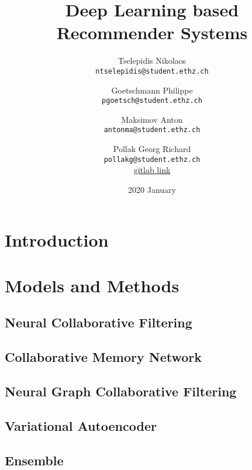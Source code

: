 \documentclass[
  twoColumns,
  fontsize=10pt,
  baseClass=extarticle
]{formularyETH/formularyETH}
\title{Deep Learning based Recommender Systems}
\author{
Tselepidis Nikolaos \\
\small{\texttt{ntselepidis@student.ethz.ch}}
    \and
Goetschmann Philippe \\
\small{\texttt{pgoetsch@student.ethz.ch}}
    \and
Maksimov Anton \\
\small{\texttt{antonma@student.ethz.ch}}
    \and
Pollak Georg Richard \\
\small{\texttt{pollakg@student.ethz.ch}}\\
{\normalsize
\faGithub\href{https://gitlab.ethz.ch/master/electives/deep-learning/deep-learning-based-recommender-systems/tree/master}{gitlab link}
}
}
\date{2020 January}
\begin{document}
\twocolumn[{%
  \begin{@twocolumnfalse} 
  \centering
  \maketitle
  \begin{abstract}
    
  \end{abstract}
  \end{@twocolumnfalse}
  \vspace*{-3em}
}]

\section{Introduction}\label{sec:introduction}


\section{Models and Methods}\label{sec:models_and_methods}
\subsection{Neural Collaborative Filtering}\label{subsec:neural_collaborative_filtering}

\subsection{Collaborative Memory Network}\label{subsec:collaborative_memory_network}

\subsection{Neural Graph Collaborative Filtering}\label{subsec:neural_graph_collaborative_filtering}

\subsection{Variational Autoencoder}\label{subsec:variational_autoencoder}

\subsection{Ensemble}\label{subsec:ensemble}

\end{document}
